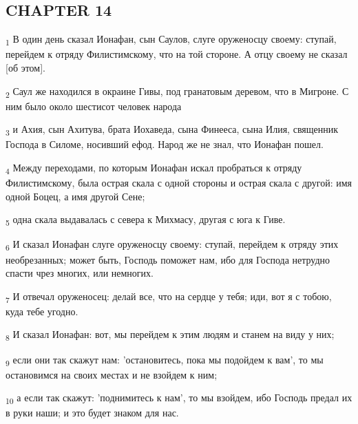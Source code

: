\subsection{CHAPTER 14}
\begin{tcolorbox}
\textsubscript{1} В один день сказал Ионафан, сын Саулов, слуге оруженосцу своему: ступай, перейдем к отряду Филистимскому, что на той стороне. А отцу своему не сказал [об этом].
\end{tcolorbox}
\begin{tcolorbox}
\textsubscript{2} Саул же находился в окраине Гивы, под гранатовым деревом, что в Мигроне. С ним было около шестисот человек народа
\end{tcolorbox}
\begin{tcolorbox}
\textsubscript{3} и Ахия, сын Ахитува, брата Иохаведа, сына Финееса, сына Илия, священник Господа в Силоме, носивший ефод. Народ же не знал, что Ионафан пошел.
\end{tcolorbox}
\begin{tcolorbox}
\textsubscript{4} Между переходами, по которым Ионафан искал пробраться к отряду Филистимскому, была острая скала с одной стороны и острая скала с другой: имя одной Боцец, а имя другой Сене;
\end{tcolorbox}
\begin{tcolorbox}
\textsubscript{5} одна скала выдавалась с севера к Михмасу, другая с юга к Гиве.
\end{tcolorbox}
\begin{tcolorbox}
\textsubscript{6} И сказал Ионафан слуге оруженосцу своему: ступай, перейдем к отряду этих необрезанных; может быть, Господь поможет нам, ибо для Господа нетрудно спасти чрез многих, или немногих.
\end{tcolorbox}
\begin{tcolorbox}
\textsubscript{7} И отвечал оруженосец: делай все, что на сердце у тебя; иди, вот я с тобою, куда тебе угодно.
\end{tcolorbox}
\begin{tcolorbox}
\textsubscript{8} И сказал Ионафан: вот, мы перейдем к этим людям и станем на виду у них;
\end{tcolorbox}
\begin{tcolorbox}
\textsubscript{9} если они так скажут нам: 'остановитесь, пока мы подойдем к вам', то мы остановимся на своих местах и не взойдем к ним;
\end{tcolorbox}
\begin{tcolorbox}
\textsubscript{10} а если так скажут: 'поднимитесь к нам', то мы взойдем, ибо Господь предал их в руки наши; и это будет знаком для нас.
\end{tcolorbox}
